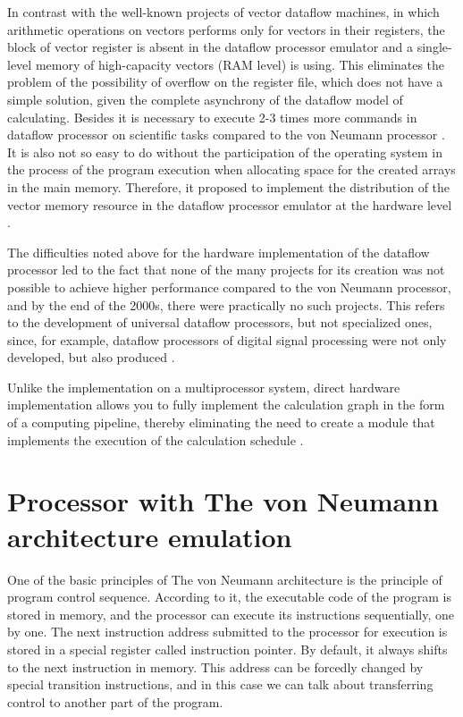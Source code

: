 \documentclass[
11pt,%
tightenlines,%
twoside,%
onecolumn,%
nofloats,%
nobibnotes,%
nofootinbib,%
superscriptaddress,%
noshowpacs,%
centertags]%
{revtex4}
\begin{document}
In contrast with the well-known projects of vector dataflow machines, in which arithmetic operations on vectors performs only for vectors in their registers, the block of vector register is absent in the dataflow processor emulator and a single-level memory of high-capacity vectors (RAM level) is using. This eliminates the problem of the possibility of overflow on the register file, which does not have a simple solution, given the complete asynchrony of the dataflow model of calculating. Besides it is necessary to execute 2-3 times more commands in dataflow processor on scientific tasks compared to the von Neumann processor \cite{multithreading}. It is also not so easy to do without the participation of the operating system in the process of the program execution when allocating space for the created arrays in the main memory. Therefore, it proposed to implement the distribution of the vector memory resource in the dataflow processor emulator at the hardware level \cite{vpp}.

The difficulties noted above for the hardware implementation of the dataflow processor led to the fact that none of the many projects for its creation was not possible to achieve higher performance compared to the von Neumann processor, and by the end of the 2000s, there were practically no such projects. This refers to the development of universal dataflow processors, but not specialized ones, since, for example, dataflow processors of digital signal processing were not only developed, but also produced \cite{terada}.

Unlike the implementation on a multiprocessor system, direct hardware implementation allows you to fully implement the calculation graph in the form of a computing pipeline, thereby eliminating the need to create a module that implements the execution of the calculation schedule \cite{popov}.

\section{Processor with The von Neumann architecture emulation}

One of the basic principles of The von Neumann architecture is the principle of program control sequence. According to it, the executable code of the program is stored in memory, and the processor can execute its instructions sequentially, one by one. The next instruction address submitted to the processor for execution is stored in a special register called instruction pointer. By default, it always shifts to the next instruction in memory. This address can be forcedly changed by special transition instructions, and in this case we can talk about transferring control to another part of the program.
\end{document}

